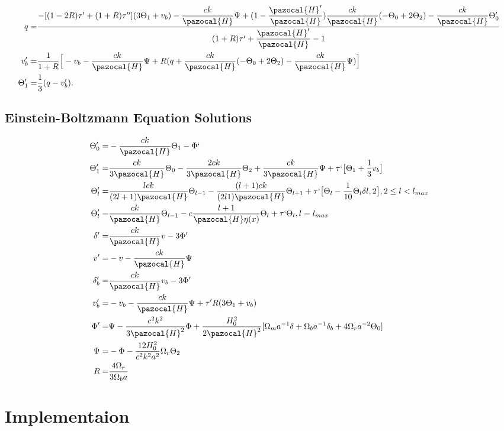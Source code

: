 \documentclass[a4paper]{article}
\begin{document}
\begin{align}
q =& \dfrac{-[(1-2R)\tau' + (1+R)\tau''](3\Theta_1 + v_b) - \dfrac{ck}{\pazocal{H}}\Psi + (1-\dfrac{\pazocal{H}'}{\pazocal{H}})\dfrac{ck}{\pazocal{H}}(-\Theta_0 + 2\Theta_2) - \dfrac{ck}{\pazocal{H}}\Theta_0'}{(1+R)\tau'+ \dfrac{\pazocal{H}'}{\pazocal{H}}-1} \\
v_b' =& \dfrac{1}{1+R}\Big[-v_b - \dfrac{ck}{\pazocal{H}}\Psi + R(q + \dfrac{ck}{\pazocal{H}}(-\Theta_0 + 2\Theta_2) - \dfrac{ck}{\pazocal{H}}\Psi)\Big] \\
\Theta_1' =& \dfrac{1}{3}(q-v_b').
\end{align}

\subsection{Einstein-Boltzmann Equation Solutions}\label{subsec:einbol}

\begin{align}
\Theta_0' =& -\dfrac{ck}{\pazocal{H}}\Theta_1 - \Phi` \\
\Theta_1' =& \dfrac{ck}{3\pazocal{H}}\Theta_0 - \dfrac{2ck}{3\pazocal{H}}\Theta_2 + \dfrac{ck}{3\pazocal{H}}\Psi + \tau`\big[\Theta_1 + \dfrac{1}{3}v_b\big] \\
\Theta_l' =& \dfrac{lck}{(2l+1)\pazocal{H}}\Theta_{l-1} - \dfrac{(l+1)ck}{(2l1)\pazocal{H}}\Theta_{l+1} + \tau`\big[\Theta_l - \dfrac{1}{10}\Theta_l\delta{l,2}\big], 2 \leq l < l_{max} \\
\Theta_l' =& \dfrac{ck}{\pazocal{H}}\Theta_{l-1} - c\dfrac{l+1}{\pazocal{H}\eta(x)}\Theta_l + \tau`\Theta_l, l=l_{max} \\
\delta' =& \dfrac{ck}{\pazocal{H}}v - 3\Phi' \\
v' =& -v-\dfrac{ck}{\pazocal{H}}\Psi \\
\delta_b' =& \dfrac{ck}{\pazocal{H}}v_b - 3\Phi' \\
v_b' =& -v_b - \dfrac{ck}{\pazocal{H}}\Psi + \tau'R(3\Theta_1 + v_b) \\
\Phi' =& \Psi - \dfrac{c^2k^2}{3\pazocal{H}^2}\Phi + \dfrac{H_0^2}{2\pazocal{H}^2}[\Omega_m a^{-1}\delta + \Omega_b a^{-1} \delta_b + 4\Omega_r a^{-2}\Theta_0] \\
\Psi =& -\Phi- \dfrac{12H_0^2}{c^2k^2a^2}\Omega_r\Theta_2 \\
R  =& \dfrac{4\Omega_r}{3\Omega_ba}
\end{align}

\section{Implementaion}\label{sec:imp}
\end{document}
